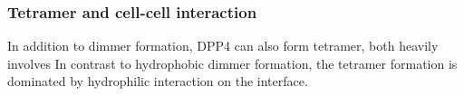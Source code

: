\subsubsection{Tetramer and cell-cell interaction}

In addition to dimmer formation, DPP4 can also form tetramer, both heavily involves In contrast to hydrophobic dimmer formation, the tetramer formation is dominated by hydrophilic interaction on the interface.~\cite{Engel_2003} 